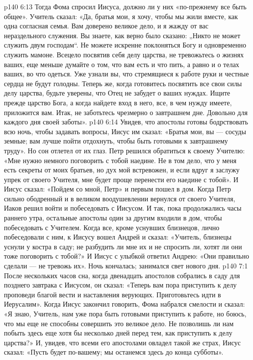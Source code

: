 \vs p140 6:13 Тогда Фома спросил Иисуса, должно ли у них «по\hyp{}прежнему все быть общее». Учитель сказал: «Да, братья мои, я хочу, чтобы мы жили вместе, как одна согласная семья. Вам доверено великое дело, и я жажду от вас нераздельного служения. Вы знаете, как верно было сказано: „Никто не может служить двум господам“. Не можете искренне поклоняться Богу и одновременно служить мамоне. Всецело посвятив себя делу царства, не тревожьтесь о жизнях ваших, еще меньше думайте о том, что вам есть и что пить, а равно и о телах ваших, во что одеться. Уже узнали вы, что стремящиеся к работе руки и честные сердца не будут голодны. Теперь же, когда готовитесь посвятить все свои силы делу царства, будьте уверены, что Отец не забудет о ваших нуждах. Ищите прежде царство Бога, а когда найдете вход в него, все, в чем нужду имеете, приложится вам. Итак, не заботьтесь чрезмерно о завтрашнем дне. Довольно для каждого дня своей заботы».
\vs p140 6:14 Увидев, что апостолы готовы бодрствовать всю ночь, чтобы задавать вопросы, Иисус им сказал: «Братья мои, вы --- сосуды земные; вам лучше пойти отдохнуть, чтобы быть готовыми к завтрашнему труду». Но сон отлетел от их глаз. Петр решился обратиться к своему Учителю: «Мне нужно немного поговорить с тобой наедине. Не в том дело, что у меня есть секреты от моих братьев, но дух мой встревожен, и если вдруг я заслужу упрек от своего Учителя, мне будет проще перенести его наедине с тобой». И Иисус сказал: «Пойдем со мной, Петр» и первым пошел в дом. Когда Петр сильно ободренный и в великом воодушевлении вернулся от своего Учителя, Иаков решил войти и побеседовать с Иисусом. И так, пока продолжались часы раннего утра, остальные апостолы один за другим входили в дом, чтобы побеседовать с Учителем. Когда все, кроме уснувших близнецов, лично побеседовали с ним, к Иисусу вошел Андрей и сказал: «Учитель, близнецы уснули у костра в саду; не разбудить ли мне их и не спросить ли, хотят ли они тоже поговорить с тобой?» И Иисус с улыбкой ответил Андрею: «Они правильно сделали --- не тревожь их». Ночь кончалась; занимался свет нового дня.
\vs p140 7:1 После нескольких часов сна, когда двенадцать апостолов собрались в саду для позднего завтрака с Иисусом, он сказал: «Теперь вам пора приступить к делу проповеди благой вести и наставления верующих. Приготовьтесь идти в Иерусалим». Когда Иисус закончил говорить, Фома набрался смелости и сказал: «Я знаю, Учитель, нам уже пора быть готовыми приступить к работе, но боюсь, что мы еще не способны совершить это великое дело. Не позволишь ли нам побыть здесь еще хотя бы несколько дней перед тем, как приступить к делу царства?» И, увидев, что всеми его апостолами овладел такой же страх, Иисус сказал: «Пусть будет по\hyp{}вашему; мы останемся здесь до конца субботы».
